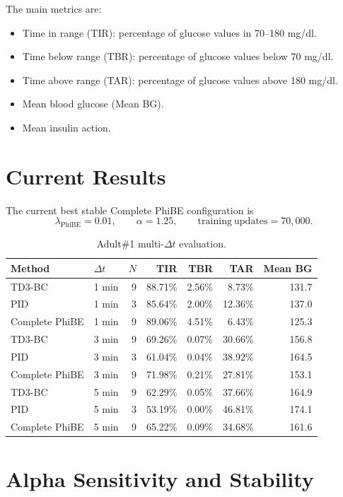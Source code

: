 \documentclass[11pt]{article}
\begin{document}
The main metrics are:
\begin{itemize}
\item Time in range (TIR): percentage of glucose values in 70--180 mg/dl.
\item Time below range (TBR): percentage of glucose values below 70 mg/dl.
\item Time above range (TAR): percentage of glucose values above 180 mg/dl.
\item Mean blood glucose (Mean BG).
\item Mean insulin action.
\end{itemize}

\section{Current Results}

The current best stable Complete PhiBE configuration is
\[
\lambda_{\mathrm{PhiBE}}=0.01,
\qquad
\alpha=1.25,
\qquad
\mathrm{training\ updates}=70{,}000.
\]

\begin{table}[h]
\centering
\caption{Adult\#1 multi-\(\Delta t\) evaluation.}
\label{tab:main_results}
\begin{tabular}{llrrrrr}
\toprule
Method & \(\Delta t\) & \(N\) & TIR & TBR & TAR & Mean BG \\
\midrule
TD3-BC & 1 min & 9 & 88.71\% & 2.56\% & 8.73\% & 131.7 \\
PID & 1 min & 3 & 85.64\% & 2.00\% & 12.36\% & 137.0 \\
Complete PhiBE & 1 min & 9 & 89.06\% & 4.51\% & 6.43\% & 125.3 \\
\midrule
TD3-BC & 3 min & 9 & 69.26\% & 0.07\% & 30.66\% & 156.8 \\
PID & 3 min & 3 & 61.04\% & 0.04\% & 38.92\% & 164.5 \\
Complete PhiBE & 3 min & 9 & 71.98\% & 0.21\% & 27.81\% & 153.1 \\
\midrule
TD3-BC & 5 min & 9 & 62.29\% & 0.05\% & 37.66\% & 164.9 \\
PID & 5 min & 3 & 53.19\% & 0.00\% & 46.81\% & 174.1 \\
Complete PhiBE & 5 min & 9 & 65.22\% & 0.09\% & 34.68\% & 161.6 \\
\bottomrule
\end{tabular}
\end{table}

\section{Alpha Sensitivity and Stability}
\end{document}
